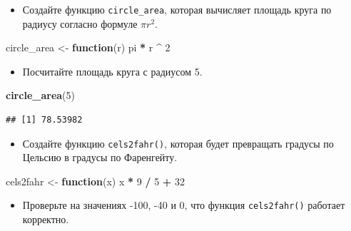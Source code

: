 \documentclass[]{book}
\newenvironment{Shaded}{\begin{snugshade}}{\end{snugshade}}
\newcommand{\KeywordTok}[1]{\textcolor[rgb]{0.13,0.29,0.53}{\textbf{#1}}}
\newcommand{\DecValTok}[1]{\textcolor[rgb]{0.00,0.00,0.81}{#1}}
\newcommand{\StringTok}[1]{\textcolor[rgb]{0.31,0.60,0.02}{#1}}
\newcommand{\ControlFlowTok}[1]{\textcolor[rgb]{0.13,0.29,0.53}{\textbf{#1}}}
\newcommand{\OperatorTok}[1]{\textcolor[rgb]{0.81,0.36,0.00}{\textbf{#1}}}
\newcommand{\NormalTok}[1]{#1}
\providecommand{\tightlist}{%
  \setlength{\itemsep}{0pt}\setlength{\parskip}{0pt}}
\begin{document}
\begin{itemize}
\tightlist
\item
  Создайте функцию \texttt{circle\_area}, которая вычисляет площадь
  круга по радиусу согласно формуле \(\pi r^2\).
\end{itemize}

\begin{Shaded}
\begin{Highlighting}[]
\NormalTok{circle_area <-}\StringTok{ }\ControlFlowTok{function}\NormalTok{(r) pi }\OperatorTok{*}\StringTok{ }\NormalTok{r }\OperatorTok{^}\StringTok{ }\DecValTok{2}
\end{Highlighting}
\end{Shaded}

\begin{itemize}
\tightlist
\item
  Посчитайте площадь круга с радиусом 5.
\end{itemize}

\begin{Shaded}
\begin{Highlighting}[]
\KeywordTok{circle_area}\NormalTok{(}\DecValTok{5}\NormalTok{)}
\end{Highlighting}
\end{Shaded}

\begin{verbatim}
## [1] 78.53982
\end{verbatim}

\begin{itemize}
\tightlist
\item
  Создайте функцию \texttt{cels2fahr()}, которая будет превращать
  градусы по Цельсию в градусы по Фаренгейту.
\end{itemize}

\begin{Shaded}
\begin{Highlighting}[]
\NormalTok{cels2fahr <-}\StringTok{ }\ControlFlowTok{function}\NormalTok{(x) x }\OperatorTok{*}\StringTok{ }\DecValTok{9} \OperatorTok{/}\StringTok{ }\DecValTok{5} \OperatorTok{+}\StringTok{ }\DecValTok{32}
\end{Highlighting}
\end{Shaded}

\begin{itemize}
\tightlist
\item
  Проверьте на значениях -100, -40 и 0, что функция \texttt{cels2fahr()}
  работает корректно.
\end{itemize}
\end{document}
